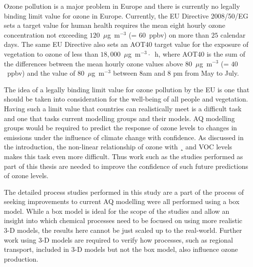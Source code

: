 Ozone pollution is a major problem in Europe and there is currently no legally binding limit value for ozone in Europe.
Currently, the EU Directive 2008/50/EG sets a target value for human health requires the mean eight hourly ozone concentration not exceeding $120$~$\mu$g~m$^{-3}$ (= $60$~ppbv) on more than $25$ calendar days.
The same EU Directive also sets an AOT40 target value for the exposure of vegetation to ozone of less than $18,000$~$\mu$g~m$^{-3} \cdot$~h, where AOT40 is the sum of the differences between the mean hourly ozone values above $80$~$\mu$g~m$^{-3}$ (= $40$~ppbv) and the value of $80$~$\mu$g~m$^{-3}$ between 8am and 8 pm from May to July.

The idea of a legally binding limit value for ozone pollution by the EU is one that should be taken into consideration for the well-being of all people and vegetation.
Having such a limit value that countries can realistically meet is a difficult task and one that tasks current modelling groups and their models.
AQ modelling groups would be required to predict the response of ozone levels to changes in emissions under the influence of climate change with confidence.
As discussed in the introduction, the non-linear relationship of ozone with ¸ and VOC levels makes this task even more difficult.
Thus work such as the studies performed as part of this thesis are needed to improve the confidence of such future predictions of ozone levels.

The detailed process studies performed in this study are a part of the process of seeking improvements to current AQ modelling were all performed using a box model.
While a box model is ideal for the scope of the studies and allow an insight into which chemical processes need to be focused on using more realistic 3-D models, the results here cannot be just scaled up to the real-world.
Further work using 3-D models are required to verify how processes, such as regional transport, included in 3-D models but not the box model, also influence ozone production.

